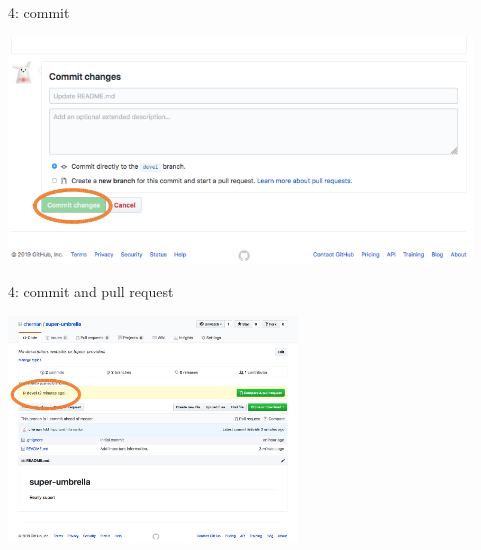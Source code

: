 \begin{frame}{ }
\begin{exampleblock}{4: commit}
    \begin{center}
    \includegraphics[height=6cm]{05_history/Images/FAIR_githubTP_commit.png}
    \end{center}
\end{exampleblock}
\end{frame}
\begin{frame}{ }
\begin{exampleblock}{4: commit and pull request}
    \begin{center}
    \includegraphics[height=6cm]{05_history/Images/FAIR_githubTP_commitOk.png}
    \end{center}
\end{exampleblock}
\end{frame}
